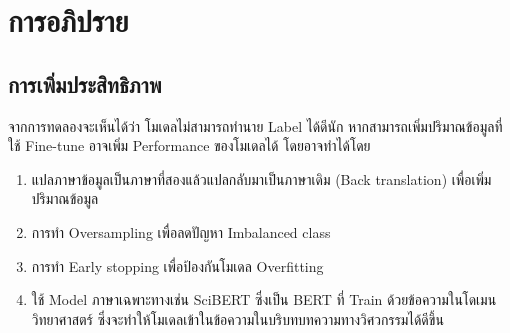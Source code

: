 \chapter{การอภิปราย}
\section{การเพิ่มประสิทธิภาพ}
จากการทดลองจะเห็นได้ว่า โมเดลไม่สามารถทำนาย Label ได้ดีนัก หากสามารถเพิ่มปริมาณข้อมูลที่ใช้ Fine-tune อาจเพิ่ม Performance ของโมเดลได้ โดยอาจทำได้โดย
\begin{enumerate}
    \item แปลภาษาข้อมูลเป็นภาษาที่สองแล้วแปลกลับมาเป็นภาษาเดิม (Back translation) เพื่อเพิ่มปริมาณข้อมูล
    \item การทำ Oversampling เพื่อลดปัญหา Imbalanced class
    \item การทำ Early stopping เพื่อป้องกันโมเดล Overfitting
    \item ใช้ Model ภาษาเฉพาะทางเช่น SciBERT ซึ่งเป็น BERT ที่ Train ด้วยข้อความในโดเมนวิทยาศาสตร์ ซึ่งจะทำให้โมเดลเข้าในข้อความในบริบทบทความทางวิศวกรรมได้ดีขึ้น
\end{enumerate}